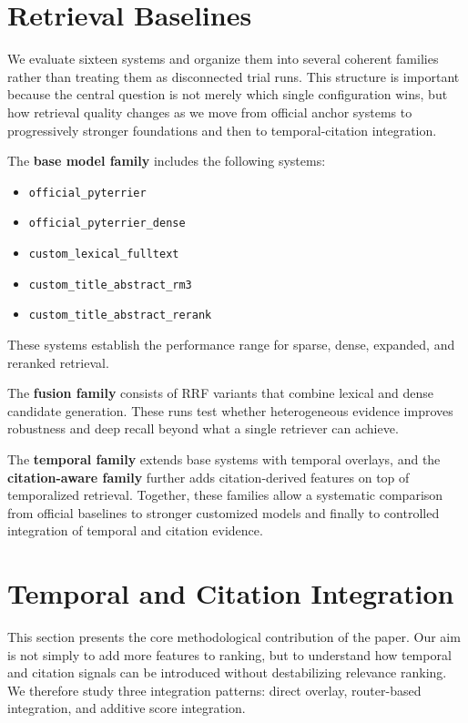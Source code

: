 \documentclass[11pt]{article}
\begin{document}
\section{Retrieval Baselines}

We evaluate sixteen systems and organize them into several coherent families rather than treating them as disconnected trial runs. This structure is important because the central question is not merely which single configuration wins, but how retrieval quality changes as we move from official anchor systems to progressively stronger foundations and then to temporal-citation integration.

The \textbf{base model family} includes the following systems:
\begin{itemize}[leftmargin=1.5em]
    \item \texttt{official\_pyterrier}
    \item \texttt{official\_pyterrier\_dense}
    \item \texttt{custom\_lexical\_fulltext}
    \item \texttt{custom\_title\_abstract\_rm3}
    \item \texttt{custom\_title\_abstract\_rerank}
\end{itemize}
These systems establish the performance range for sparse, dense, expanded, and reranked retrieval.

The \textbf{fusion family} consists of RRF variants that combine lexical and dense candidate generation. These runs test whether heterogeneous evidence improves robustness and deep recall beyond what a single retriever can achieve.

The \textbf{temporal family} extends base systems with temporal overlays, and the \textbf{citation-aware family} further adds citation-derived features on top of temporalized retrieval. Together, these families allow a systematic comparison from official baselines to stronger customized models and finally to controlled integration of temporal and citation evidence.

\section{Temporal and Citation Integration}
\label{sec:temporal-citation}

This section presents the core methodological contribution of the paper. Our aim is not simply to add more features to ranking, but to understand how temporal and citation signals can be introduced without destabilizing relevance ranking. We therefore study three integration patterns: direct overlay, router-based integration, and additive score integration.
\end{document}

